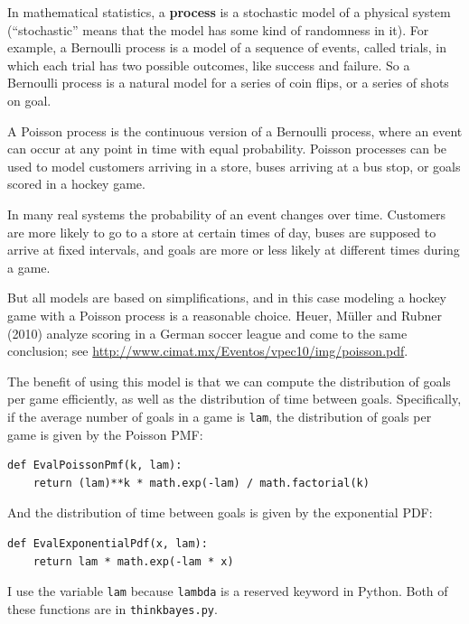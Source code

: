 \documentclass[12pt]{book}
\begin{document}
In mathematical statistics, a {\bf process} is a stochastic model of a
physical system (``stochastic'' means that the model has some kind of
randomness in it).  For example, a Bernoulli process is a model of a
sequence of events, called trials, in which each trial has two
possible outcomes, like success and failure.  So a Bernoulli process
is a natural model for a series of coin flips, or a series of shots on
goal.   

A Poisson process is the continuous version of a Bernoulli process,
where an event can occur at any point in time with equal probability.
Poisson processes can be used to model customers arriving in a store,
buses arriving at a bus stop, or goals scored in a hockey game.

In many real systems the probability of an event changes over time.
Customers are more likely to go to a store at certain times of day,
buses are supposed to arrive at fixed intervals, and goals are more
or less likely at different times during a game.

But all models are based on simplifications, and in this case modeling
a hockey game with a Poisson process is a reasonable choice.  Heuer,
M\"{u}ller and Rubner (2010) analyze scoring in a German soccer league
and come to the same conclusion; see
\url{http://www.cimat.mx/Eventos/vpec10/img/poisson.pdf}.

The benefit of using this model is that we can compute the distribution
of goals per game efficiently, as well as the distribution of time
between goals.  Specifically, if the average number of goals
in a game is {\tt lam}, the distribution of goals per game is
given by the Poisson PMF:

\begin{verbatim}
def EvalPoissonPmf(k, lam):
    return (lam)**k * math.exp(-lam) / math.factorial(k)
\end{verbatim}  

And the distribution of time between goals is given by the
exponential PDF:

\begin{verbatim}
def EvalExponentialPdf(x, lam):
    return lam * math.exp(-lam * x)
\end{verbatim}  

I use the variable
{\tt lam} because {\tt lambda} is a reserved keyword in Python.
Both of these functions are in \verb"thinkbayes.py".
\end{document}
